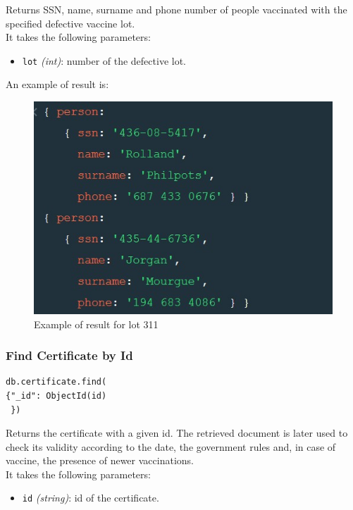 \documentclass[12pt, a4paper]{article}
\begin{document}
\noindent %
Returns SSN, name, surname and phone number of people vaccinated with the specified 
defective vaccine lot. \\
It takes the following parameters:
\begin{itemize}
    \item \texttt{lot} \emph{(int)}: number of the defective lot.
\end{itemize}
An example of result is:
\begin{figure}[ht]
    \centering
    \includegraphics[width=.6\linewidth]{defective_lot.jpg}
    \caption*{Example of result for lot 311} %
\end{figure}

\subsubsection{Find Certificate by Id}
\begin{tcolorbox}[fontupper=\scriptsize]
    \begin{verbatim}
db.certificate.find(
{"_id": ObjectId(id)
 })
    \end{verbatim}
\end{tcolorbox}

\noindent %
Returns the certificate with a given id. The retrieved document is later used to check 
its validity according to the date, the government rules and, in case of vaccine, the 
presence of newer vaccinations. \\
It takes the following parameters:
\begin{itemize}
    \item \texttt{id} \emph{(string)}: id of the certificate.
\end{itemize}
\end{document}

